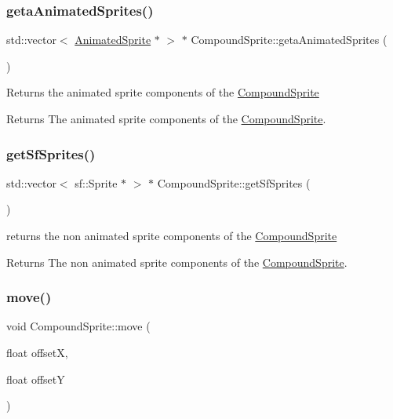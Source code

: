 \subsubsection{\texorpdfstring{geta\+Animated\+Sprites()}{getaAnimatedSprites()}}
{\footnotesize\ttfamily std\+::vector$<$ \hyperlink{class_animated_sprite}{Animated\+Sprite} $\ast$ $>$ $\ast$ Compound\+Sprite\+::geta\+Animated\+Sprites (\begin{DoxyParamCaption}{ }\end{DoxyParamCaption})}



Returns the animated sprite components of the \hyperlink{class_compound_sprite}{Compound\+Sprite} 

\begin{DoxyReturn}{Returns}
The animated sprite components of the \hyperlink{class_compound_sprite}{Compound\+Sprite}.
\end{DoxyReturn}
\mbox{\label{class_compound_sprite_ad52cfe65b36ff363698377b115c142e1}} 
\subsubsection{\texorpdfstring{get\+Sf\+Sprites()}{getSfSprites()}}
{\footnotesize\ttfamily std\+::vector$<$ sf\+::\+Sprite $\ast$ $>$ $\ast$ Compound\+Sprite\+::get\+Sf\+Sprites (\begin{DoxyParamCaption}{ }\end{DoxyParamCaption})}



returns the non animated sprite components of the \hyperlink{class_compound_sprite}{Compound\+Sprite} 

\begin{DoxyReturn}{Returns}
The non animated sprite components of the \hyperlink{class_compound_sprite}{Compound\+Sprite}.
\end{DoxyReturn}
\mbox{\label{class_compound_sprite_a8d9e7f79dc9c3137f1ff24c5201f61ec}} 
\subsubsection{\texorpdfstring{move()}{move()}}
{\footnotesize\ttfamily void Compound\+Sprite\+::move (\begin{DoxyParamCaption}\item[{float}]{offsetX,  }\item[{float}]{offsetY }\end{DoxyParamCaption})}



